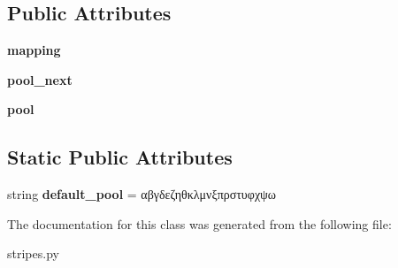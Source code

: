 \subsection*{Public Attributes}
\begin{DoxyCompactItemize}
\item 
\mbox{\label{classCBGM_1_1stripes_1_1LabelMapper_a8bff3226952923179963889b8ff1de77}} 
{\bfseries mapping}
\item 
\mbox{\label{classCBGM_1_1stripes_1_1LabelMapper_a24964fac9f649f238a77359738861b90}} 
{\bfseries pool\+\_\+next}
\item 
\mbox{\label{classCBGM_1_1stripes_1_1LabelMapper_a1a66c88dc0b3f3f41ca33ca7efc7d018}} 
{\bfseries pool}
\end{DoxyCompactItemize}
\subsection*{Static Public Attributes}
\begin{DoxyCompactItemize}
\item 
\mbox{\label{classCBGM_1_1stripes_1_1LabelMapper_a4cdba0dcd7009342c411877298f41d2d}} 
string {\bfseries default\+\_\+pool} = \textquotesingle{}αβγδεζηθκλμνξπρστυφχψω\textquotesingle{}
\end{DoxyCompactItemize}


The documentation for this class was generated from the following file\+:\begin{DoxyCompactItemize}
\item 
stripes.\+py\end{DoxyCompactItemize}
